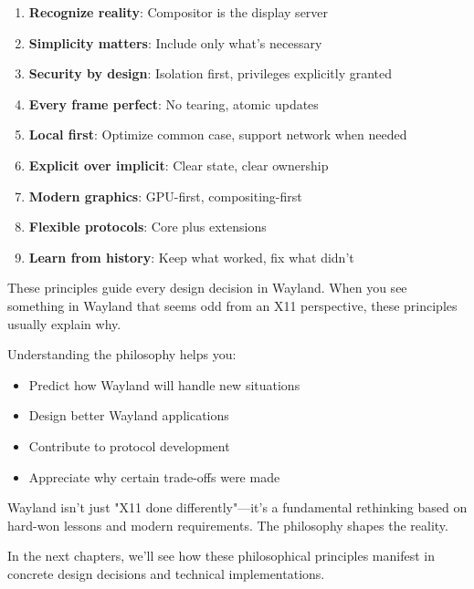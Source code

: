 \begin{enumerate}
    \item \textbf{Recognize reality}: Compositor is the display server
    \item \textbf{Simplicity matters}: Include only what's necessary
    \item \textbf{Security by design}: Isolation first, privileges explicitly granted
    \item \textbf{Every frame perfect}: No tearing, atomic updates
    \item \textbf{Local first}: Optimize common case, support network when needed
    \item \textbf{Explicit over implicit}: Clear state, clear ownership
    \item \textbf{Modern graphics}: GPU-first, compositing-first
    \item \textbf{Flexible protocols}: Core plus extensions
    \item \textbf{Learn from history}: Keep what worked, fix what didn't
\end{enumerate}

These principles guide every design decision in Wayland. When you see something in Wayland that seems odd from an X11 perspective, these principles usually explain why.

Understanding the philosophy helps you:
\begin{itemize}
    \item Predict how Wayland will handle new situations
    \item Design better Wayland applications
    \item Contribute to protocol development
    \item Appreciate why certain trade-offs were made
\end{itemize}

Wayland isn't just "X11 done differently"—it's a fundamental rethinking based on hard-won lessons and modern requirements. The philosophy shapes the reality.

In the next chapters, we'll see how these philosophical principles manifest in concrete design decisions and technical implementations.

\clearpage
